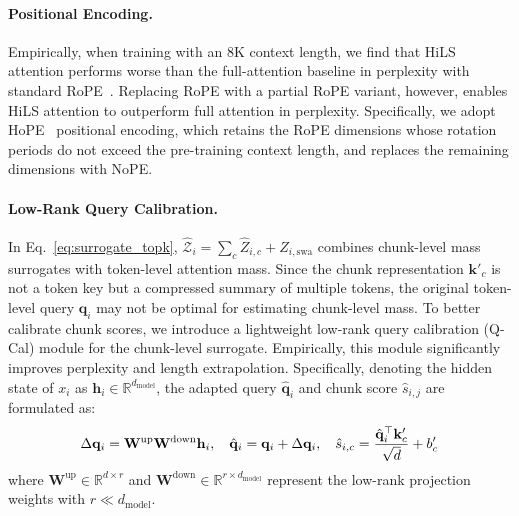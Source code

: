 \paragraph{Positional Encoding.} 

Empirically, when training with an 8K context length, we find that HiLS attention performs worse than the full-attention baseline in perplexity with standard RoPE~\cite{su2024roformer}. Replacing RoPE with a partial RoPE variant, however, enables HiLS attention to outperform full attention in perplexity. Specifically, we adopt HoPE~\cite{chen-etal-2025-hope} positional encoding, which retains the RoPE dimensions whose rotation periods do not exceed the pre-training context length, and replaces the remaining dimensions with NoPE. 

\paragraph{Low-Rank Query Calibration.} 
In Eq.~\eqref{eq:surrogate_topk}, 
$\hat{\mathcal{Z}}_i = \sum_{c} \hat{Z}_{i,c} + Z_{i,\text{swa}}$ 
combines chunk-level mass surrogates with token-level attention mass. 
Since the chunk representation $\mathbf{k}'_c$ is not a token key but a compressed summary of multiple tokens, the original token-level query $\mathbf{q}_i$ may not be optimal for estimating chunk-level mass. 
To better calibrate chunk scores, we introduce a lightweight low-rank query calibration (Q-Cal) module for the chunk-level surrogate.
Empirically, this module significantly improves perplexity and length extrapolation.
Specifically, denoting the hidden state of $x_i$ as $\mathbf{h}_i \in \mathbb{R}^{d_{\text{model}}}$,
the adapted query $\hat{\mathbf{q}}_i$ and chunk score $\hat{s}_{i,j}$ are formulated as:
\begin{equation}
\label{eq:lora_q}
\small
    \Delta \mathbf{q}_i = \mathbf{W}^{\text{up}}\mathbf{W}^{\text{down}}\mathbf{h}_i, \quad \hat{\mathbf{q}}_i = \mathbf{q}_i + \Delta \mathbf{q}_i,\quad \hat{s}_{i,c} = \frac{\hat{\mathbf{q}}_i^\top \mathbf{k}'_c}{\sqrt{d}} + b'_{c}
\end{equation}
where $\mathbf{W}^{\text{up}} \in \mathbb{R}^{d \times r}$ and $\mathbf{W}^{\text{down}} \in \mathbb{R}^{r \times d_{\text{model}}}$ represent the low-rank projection weights with $r \ll d_{\text{model}}$.

